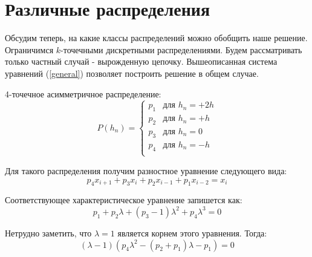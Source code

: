 \section{Различные распределения}
Обсудим теперь, на какие классы распределений можно обобщить наше решение. Ограничимся $k$-точечными дискретными распределениями.
Будем рассматривать только частный случай - вырожденную цепочку. Вышеописанная система уравнений (\ref{general}) позволяет построить решение в общем случае.

4-точечное асимметричное распределение:
\begin{equation}
P(h_n) =
\begin{cases}
p_1 &\mbox{для } h_n= +2h \\
p_2 &\mbox{для } h_n= +h \\
p_3 &\mbox{для } h_n= 0\\
p_4 &\mbox{для } h_n = -h\\
\end{cases}
\end{equation}

Для такого распределения получим разностное уравнение следующего вида:
\begin{equation}
	p_4 x_{i+1} + p_3 x_{i} + p_2 x_{i-1} +p_1 x_{i-2} = x_{i}
\end{equation}

Соответствующее характеристическое уравнение запишется как:
\begin{equation}
	p_1+ p_2\lambda + (p_3-1) \lambda^2 + p_4 \lambda^3 = 0
\end{equation}

Нетрудно заметить, что $\lambda=1$ является корнем этого уравнения. Тогда:
\begin{equation}
(\lambda - 1)(p_4 \lambda^2 - (p_2 + p_1)\lambda - p_1	) =0
\end{equation}

